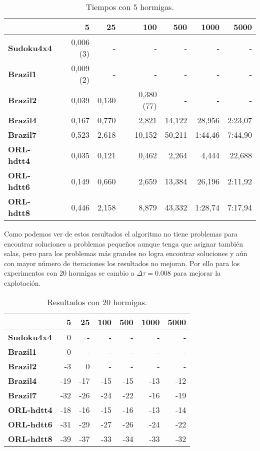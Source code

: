 \documentclass[letter, 10pt]{article}
\renewcommand{\bf}[1]{\textbf{#1}}
\begin{document}
\begin{table}[h]
\centering
\begin{tabular}{|l|r|r|r|r|r|r|}
  \hline
                 & 5         & 25 & 100   & 500    & 1000    & 5000    \\\hline
  \bf{Sudoku4x4} & 0,006 (3) & -  & -     & -      & -       & -       \\\hline
  \bf{Brazil1}   & 0,009 (2) & -  & -     & -      & -       & -       \\\hline
  \bf{Brazil2}   & 0,039 & 0,130 & 0,380 (77) & -  & -       & -       \\\hline
  \bf{Brazil4}   & 0,167 & 0,770 & 2,821  & 14,122 & 28,956  & 2:23,07 \\\hline
  \bf{Brazil7}   & 0,523 & 2,618 & 10,152 & 50,211 & 1:44,46 & 7:44,90 \\\hline
  \bf{ORL-hdtt4} & 0,035 & 0,121 & 0,462  & 2,264  & 4,444   & 22,688  \\\hline
  \bf{ORL-hdtt6} & 0,149 & 0,660 & 2,659  & 13,384 & 26,196  & 2:11,92 \\\hline
  \bf{ORL-hdtt8} & 0,446 & 2,158 & 8,879  & 43,332 & 1:28,74 & 7:17,94 \\\hline
\end{tabular}
\caption{Tiempos con 5 hormigas.}\label{tab:5ants:time}
\end{table}

Como podemos ver de estos resultados el algoritmo no tiene problemas para
encontrar soluciones a problemas pequeños aunque tenga que asignar también
salas, pero para los problemas más grandes no logra encontrar soluciones y aún
con mayor número de iteraciones los resultados no mejoran.
Por ello para los experimentos con 20 hormigas se cambio a $\Delta\tau = 0.008$
para mejorar la explotación.

\begin{table}[h]
\centering
\begin{tabular}{|l|r|r|r|r|r|r|}
  \hline
                 & 5   & 25  & 100 & 500 & 1000 & 5000  \\\hline
  \bf{Sudoku4x4} & 0   & -   & -   & -   & -    & -     \\\hline
  \bf{Brazil1}   & 0   & -   & -   & -   & -    & -     \\\hline
  \bf{Brazil2}   & -3  & 0   & -   & -   & -    & -     \\\hline
  \bf{Brazil4}   & -19 & -17 & -15 & -15 & -13  & -12   \\\hline
  \bf{Brazil7}   & -32 & -26 & -24 & -22 & -16  & -19   \\\hline
  \bf{ORL-hdtt4} & -18 & -16 & -15 & -16 & -13  & -14   \\\hline
  \bf{ORL-hdtt6} & -31 & -29 & -27 & -26 & -24  & -22   \\\hline
  \bf{ORL-hdtt8} & -39 & -37 & -33 & -34 & -33  & -32   \\\hline
\end{tabular}
\caption{Resultados con 20 hormigas.}\label{tab:20ants}
\end{table}
\end{document}
